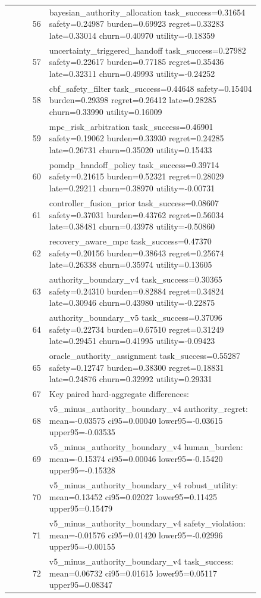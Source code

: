 \documentclass{article}
\begin{document}
\begin{center}
\begin{longtable}{rp{0.84\linewidth}}
56 & bayesian\_authority\_allocation task\_success=0.31654 safety=0.24987 burden=0.69923 regret=0.33283 late=0.33014 churn=0.40970 utility=-0.18359\\
57 & uncertainty\_triggered\_handoff task\_success=0.27982 safety=0.22617 burden=0.77185 regret=0.35436 late=0.32311 churn=0.49993 utility=-0.24252\\
58 & cbf\_safety\_filter task\_success=0.44648 safety=0.15404 burden=0.29398 regret=0.26412 late=0.28285 churn=0.33990 utility=0.16009\\
59 & mpc\_risk\_arbitration task\_success=0.46901 safety=0.19062 burden=0.33930 regret=0.24285 late=0.26731 churn=0.35020 utility=0.15433\\
60 & pomdp\_handoff\_policy task\_success=0.39714 safety=0.21615 burden=0.52321 regret=0.28029 late=0.29211 churn=0.38970 utility=-0.00731\\
61 & controller\_fusion\_prior task\_success=0.08607 safety=0.37031 burden=0.43762 regret=0.56034 late=0.38481 churn=0.43978 utility=-0.50860\\
62 & recovery\_aware\_mpc task\_success=0.47370 safety=0.20156 burden=0.38643 regret=0.25674 late=0.26338 churn=0.35974 utility=0.13605\\
63 & authority\_boundary\_v4 task\_success=0.30365 safety=0.24310 burden=0.82884 regret=0.34824 late=0.30946 churn=0.43980 utility=-0.22875\\
64 & authority\_boundary\_v5 task\_success=0.37096 safety=0.22734 burden=0.67510 regret=0.31249 late=0.29451 churn=0.41995 utility=-0.09423\\
65 & oracle\_authority\_assignment task\_success=0.55287 safety=0.12747 burden=0.38300 regret=0.18831 late=0.24876 churn=0.32992 utility=0.29331\\
67 & Key paired hard-aggregate differences:\\
68 & v5\_minus\_authority\_boundary\_v4 authority\_regret: mean=-0.03575 ci95=0.00040 lower95=-0.03615 upper95=-0.03535\\
69 & v5\_minus\_authority\_boundary\_v4 human\_burden: mean=-0.15374 ci95=0.00046 lower95=-0.15420 upper95=-0.15328\\
70 & v5\_minus\_authority\_boundary\_v4 robust\_utility: mean=0.13452 ci95=0.02027 lower95=0.11425 upper95=0.15479\\
71 & v5\_minus\_authority\_boundary\_v4 safety\_violation: mean=-0.01576 ci95=0.01420 lower95=-0.02996 upper95=-0.00155\\
72 & v5\_minus\_authority\_boundary\_v4 task\_success: mean=0.06732 ci95=0.01615 lower95=0.05117 upper95=0.08347\\

\end{longtable}
\end{center}
\end{document}
